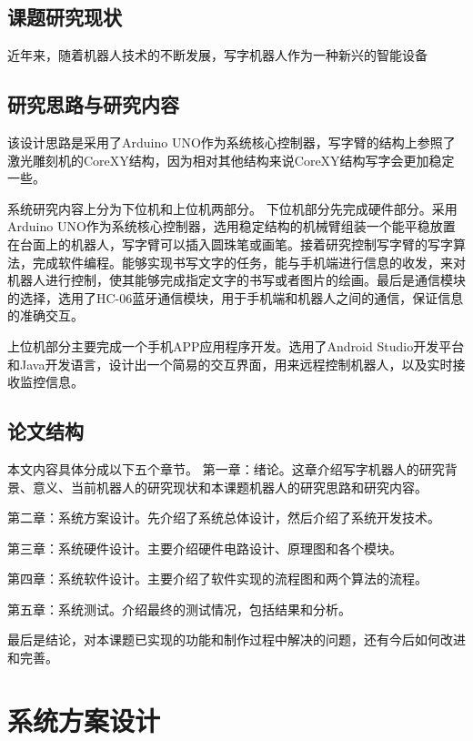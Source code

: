 \documentclass[twoside, fontset=windows]{ctexart}
\begin{document}
  \subsection{课题研究现状}
  近年来，随着机器人技术的不断发展，写字机器人作为一种新兴的智能设备
  \subsection{研究思路与研究内容}
  该设计思路是采用了Arduino UNO作为系统核心控制器，写字臂的结构上参照了激光雕刻机的CoreXY结构，因为相对其他结构来说CoreXY结构写字会更加稳定一些。

  系统研究内容上分为下位机和上位机两部分。
  下位机部分先完成硬件部分。采用Arduino UNO作为系统核心控制器，选用稳定结构的机械臂组装一个能平稳放置在台面上的机器人，写字臂可以插入圆珠笔或画笔。接着研究控制写字臂的写字算法，完成软件编程。能够实现书写文字的任务，能与手机端进行信息的收发，来对机器人进行控制，使其能够完成指定文字的书写或者图片的绘画。最后是通信模块的选择，选用了HC-06蓝牙通信模块，用于手机端和机器人之间的通信，保证信息的准确交互。

  上位机部分主要完成一个手机APP应用程序开发。选用了Android Studio开发平台和Java开发语言，设计出一个简易的交互界面，用来远程控制机器人，以及实时接收监控信息。

  \subsection{论文结构}
  本文内容具体分成以下五个章节。
第一章：绪论。这章介绍写字机器人的研究背景、意义、当前机器人的研究现状和本课题机器人的研究思路和研究内容。 

第二章：系统方案设计。先介绍了系统总体设计，然后介绍了系统开发技术。 

第三章：系统硬件设计。主要介绍硬件电路设计、原理图和各个模块。

第四章：系统软件设计。主要介绍了软件实现的流程图和两个算法的流程。

第五章：系统测试。介绍最终的测试情况，包括结果和分析。

最后是结论，对本课题已实现的功能和制作过程中解决的问题，还有今后如何改进和完善。 
\newpage

\section{系统方案设计}
\end{document}

